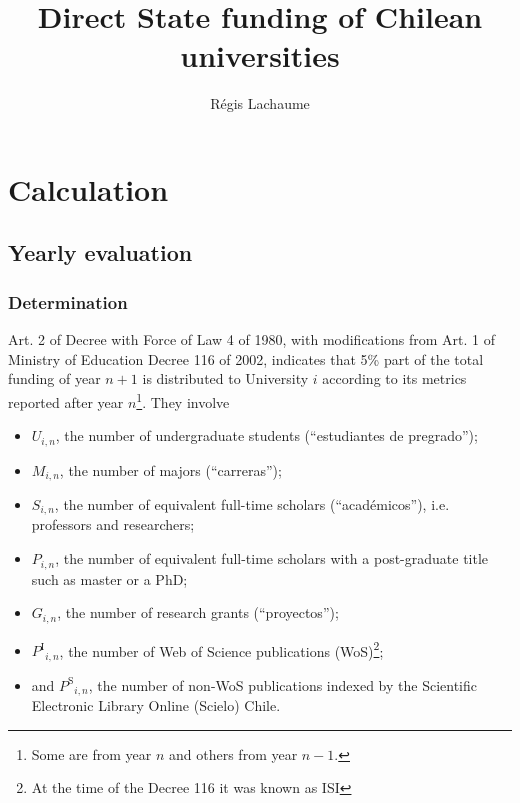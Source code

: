 \documentclass[twocolumn]{article}
\title{Direct State funding of Chilean universities}
\author{Régis Lachaume}
\def\npup{\ensuremath{U}}
\def\nmaj{\ensuremath{M}}
\def\nprof{\ensuremath{S}}
\def\ngrad{\ensuremath{P}}
\def\ngrant{\ensuremath{G}}
\def\nisi{\ensuremath{P^\text{I}}}
\def\nscielo{\ensuremath{P^\text{S}}}
\begin{document}
\maketitle

\section{Calculation}
\subsection{Yearly evaluation}
\subsubsection{Determination}
\label{sec:metrics}

Art. 2 of Decree with Force of Law 4 of 1980, with modifications from Art. 1 of Ministry of Education Decree 116 of 2002, indicates that 5\% part of the total funding of year $n + 1$ is distributed to University $i$ according to its metrics reported after year $n$\footnote{Some are from year $n$ and others from year $n-1$.}. They involve 
\begin{itemize}
\item $\npup_{i,n}$, the number of undergraduate students (``estudiantes de pregrado'');
\item $\nmaj_{i,n}$, the number of majors (``carreras'');
\item $\nprof_{i,n}$, the number of equivalent full-time scholars (``académicos''), i.e. professors and researchers;
\item $\ngrad_{i,n}$, the number of equivalent full-time scholars with a post-graduate title such as master or a PhD; 
\item $\ngrant_{i,n}$, the number of research grants (``proyectos'');
\item $\nisi_{i,n}$, the number of Web of Science publications (WoS)\footnote{At the time of the Decree 116 it was known as ISI}; 
\item and $\nscielo_{i,n}$, the number of non-WoS publications indexed by the Scientific Electronic Library Online (Scielo) Chile. 
\end{itemize}
\end{document}

